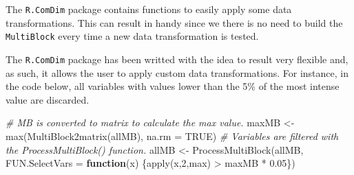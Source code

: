 \documentclass[
]{book}
\newenvironment{Shaded}{\begin{snugshade}}{\end{snugshade}}
\newcommand{\AttributeTok}[1]{\textcolor[rgb]{0.77,0.63,0.00}{#1}}
\newcommand{\CommentTok}[1]{\textcolor[rgb]{0.56,0.35,0.01}{\textit{#1}}}
\newcommand{\ConstantTok}[1]{\textcolor[rgb]{0.00,0.00,0.00}{#1}}
\newcommand{\ControlFlowTok}[1]{\textcolor[rgb]{0.13,0.29,0.53}{\textbf{#1}}}
\newcommand{\DecValTok}[1]{\textcolor[rgb]{0.00,0.00,0.81}{#1}}
\newcommand{\DocumentationTok}[1]{\textcolor[rgb]{0.56,0.35,0.01}{\textbf{\textit{#1}}}}
\newcommand{\FloatTok}[1]{\textcolor[rgb]{0.00,0.00,0.81}{#1}}
\newcommand{\FunctionTok}[1]{\textcolor[rgb]{0.00,0.00,0.00}{#1}}
\newcommand{\NormalTok}[1]{#1}
\newcommand{\OtherTok}[1]{\textcolor[rgb]{0.56,0.35,0.01}{#1}}
\newcommand{\SpecialCharTok}[1]{\textcolor[rgb]{0.00,0.00,0.00}{#1}}
\newcommand{\StringTok}[1]{\textcolor[rgb]{0.31,0.60,0.02}{#1}}
\begin{document}
The \texttt{R.ComDim} package contains functions to easily apply some data
transformations. This can result in handy since we there is no need to build
the \texttt{MultiBlock} every time a new data transformation is tested.

\begin{Shaded}
\end{Shaded}

The \texttt{R.ComDim} package has been writted with the idea to result very flexible
and, as such, it allows the user to apply custom data transformations. For
instance, in the code below, all variables with values lower than the 5\% of the
most intense value are discarded.

\begin{Shaded}
\begin{Highlighting}[]
\CommentTok{\# MB is converted to matrix to calculate the max value.}
\NormalTok{maxMB }\OtherTok{\textless{}{-}} \FunctionTok{max}\NormalTok{(}\FunctionTok{MultiBlock2matrix}\NormalTok{(allMB), }\AttributeTok{na.rm =} \ConstantTok{TRUE}\NormalTok{) }
\CommentTok{\# Variables are filtered with the ProcessMultiBlock() function.}
\NormalTok{allMB }\OtherTok{\textless{}{-}} \FunctionTok{ProcessMultiBlock}\NormalTok{(allMB,}
  \AttributeTok{FUN.SelectVars =} \ControlFlowTok{function}\NormalTok{(x) \{}\FunctionTok{apply}\NormalTok{(x,}\DecValTok{2}\NormalTok{,max) }\SpecialCharTok{\textgreater{}}\NormalTok{ maxMB }\SpecialCharTok{*} \FloatTok{0.05}\NormalTok{\})}
\end{Highlighting}
\end{Shaded}
\end{document}
